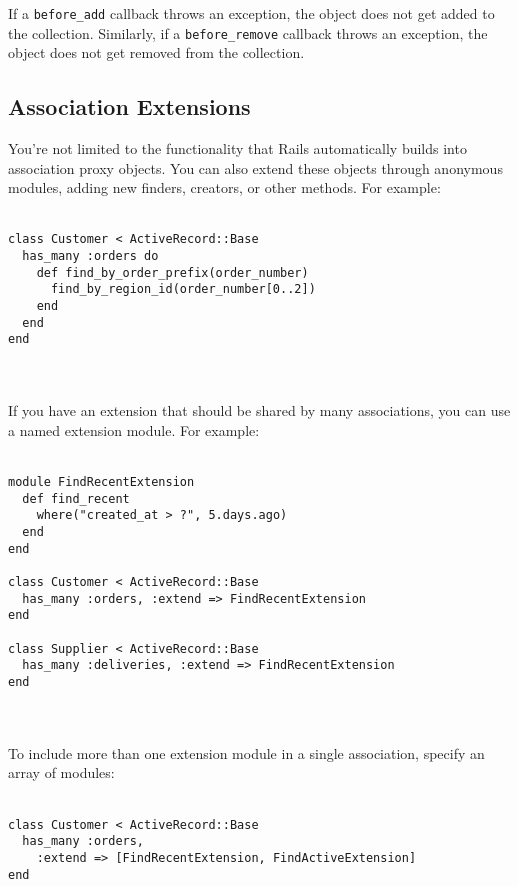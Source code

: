 \documentclass[10pt]{book}
\begin{document}
If a \texttt{before\_add} callback throws an exception, the object does not get added to the collection. Similarly, if a \texttt{before\_remove} callback throws an exception, the object does not get removed from the collection.

\subsection{ Association Extensions}

You’re not limited to the functionality that Rails automatically  builds into association proxy objects. You can also extend these objects  through anonymous modules, adding new finders, creators, or other  methods. For example:
\\ \\
\begin{minipage}{\textwidth}{\scriptsize
\begin{verbatim}
class Customer < ActiveRecord::Base
  has_many :orders do
    def find_by_order_prefix(order_number)
      find_by_region_id(order_number[0..2])
    end
  end
end
\end{verbatim}}
\end{minipage}
\\ \\

If you have an extension that should be shared by many associations, you can use a named extension module. For example:
\\ \\
\begin{minipage}{\textwidth}{\scriptsize
\begin{verbatim}
module FindRecentExtension
  def find_recent
    where("created_at > ?", 5.days.ago)
  end
end
 
class Customer < ActiveRecord::Base
  has_many :orders, :extend => FindRecentExtension
end
 
class Supplier < ActiveRecord::Base
  has_many :deliveries, :extend => FindRecentExtension
end
\end{verbatim}}
\end{minipage}
\\ \\

To include more than one extension module in a single association, specify an array of modules:
\\ \\
\begin{minipage}{\textwidth}{\scriptsize
\begin{verbatim}
class Customer < ActiveRecord::Base
  has_many :orders,
    :extend => [FindRecentExtension, FindActiveExtension]
end
\end{verbatim}}
\end{minipage}
\\ \\
\end{document}
